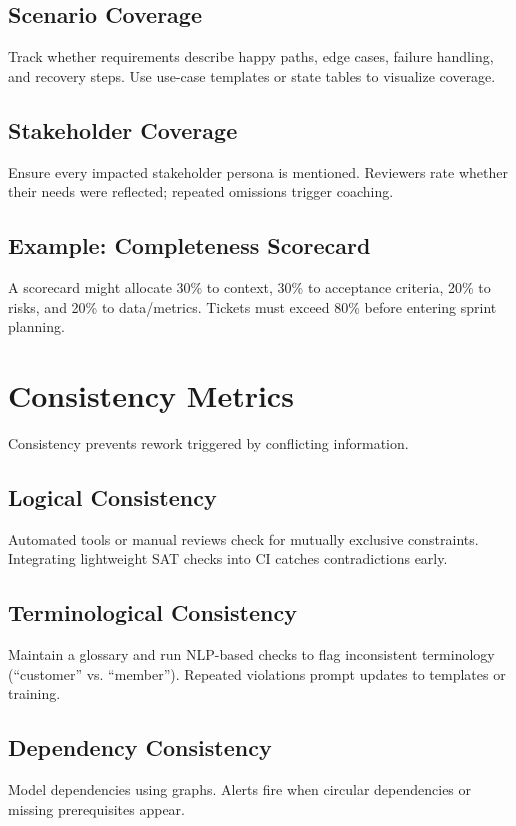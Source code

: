 \subsection{Scenario Coverage}
Track whether requirements describe happy paths, edge cases, failure handling, and recovery steps. Use use-case templates or state tables to visualize coverage.

\subsection{Stakeholder Coverage}
Ensure every impacted stakeholder persona is mentioned. Reviewers rate whether their needs were reflected; repeated omissions trigger coaching.

\subsection{Example: Completeness Scorecard}
A scorecard might allocate 30\% to context, 30\% to acceptance criteria, 20\% to risks, and 20\% to data/metrics. Tickets must exceed 80\% before entering sprint planning.

\section{Consistency Metrics}
\label{sec:consistency-metrics}

Consistency prevents rework triggered by conflicting information.

\subsection{Logical Consistency}
Automated tools or manual reviews check for mutually exclusive constraints. Integrating lightweight SAT checks into CI catches contradictions early.

\subsection{Terminological Consistency}
Maintain a glossary and run NLP-based checks to flag inconsistent terminology (``customer'' vs. ``member''). Repeated violations prompt updates to templates or training.

\subsection{Dependency Consistency}
Model dependencies using graphs. Alerts fire when circular dependencies or missing prerequisites appear.

